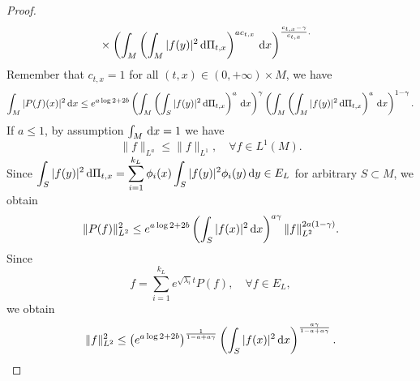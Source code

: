 \begin{proof}
\begin{equation}
\begin{aligned}
		    &\times\left( \int_M\left( \int_{M}|f(y)|^2\,\mathrm{d} \Pi_{t,x} \right) ^{ac_{t,x}}\,\mathrm{d} x\right)^{\frac{c_{t,x}-\gamma}{c_{t,x}}.}
\end{aligned}
\end{equation}
Remember that $c_{t,x}=1$ for all $(t,x)\in (0,+\infty)\times M$, we have
\begin{equation}
	\int_{M}|P(f)(x)|^2\,\mathrm{d} x\le e^{a\log 2+2b}\left( \int_{M}\left( \int_S|f(y)|^2\,\mathrm{d}\Pi_{t,x} \right) ^{a}\,\mathrm{d} x \right) ^{\gamma}\left( \int_M \left( \int_M|f(y)|^2\,\mathrm{d}\Pi_{t,x} \right) ^{a} \,\mathrm{d} x\right) ^{1-\gamma}.
\end{equation}
If $a\le 1$, by assumption $\int_M\,\mathrm{d} x=1$ we have
\begin{equation}
	\|f\|_{L^{a}}\le \|f\|_{L^{1}},\quad \forall f\in L^1(M).
\end{equation}
Since $\displaystyle\int_S|f(y)|^2\,\mathrm{d}\Pi_{t,x}=\sum_{i=1}^{k_L} \phi_i(x)\int_S|f(y)|^2\phi_i(y)\,\mathrm{d} y \in E_L$ for arbitrary $S\subset M$, we obtain
\begin{equation}
\|P(f)\|_{L^2}^2\le e^{a\log 2+2b} \left( \int_S|f(x)|^2\,\mathrm{d} x \right) ^{a\gamma} \|f\|_{L^2}^{2a\left( 1-\gamma \right) }.
\end{equation}
Since
\[
f=\sum_{i=1}^{k_L} e^{\sqrt{\lambda_i} t}P(f),\quad \forall f\in E_L,
\] 
we obtain
\begin{equation*}
	\|f\|_{L^2}^2\le  \left(e^{a\log 2+2b}\right)^{\frac{1}{1-a+a\gamma} }\left( \int_S|f(x)|^2\,\mathrm{d} x \right) ^{\frac{a \gamma}{1-a+a\gamma}}.
\end{equation*} 
\end{proof}



